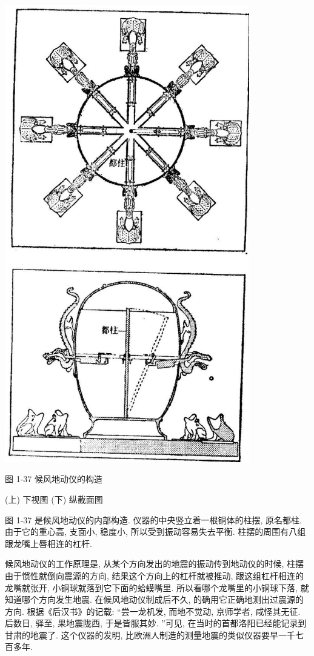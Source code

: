 \documentclass[10pt]{article}
\begin{document}
\begin{center}
\includegraphics[max width=0.8\textwidth]{images/01912d55-147c-70aa-b0e0-1782a122f948_49_654467.jpg}
\end{center}

图 1-37 候风地动仪的构造

(上) 下视图 (下) 纵截面图

图 1-37 是候风地动仪的内部构造. 仪器的中央竖立着一根铜体的柱摆, 原名都柱. 由于它的重心高, 支面小, 稳度小, 所以受到振动容易失去平衡. 柱摆的周围有八组跟龙嘴上唇相连的杠杆.

候风地动仪的工作原理是, 从某个方向发出的地震的振动传到地动仪的时候, 柱摆由于惯性就倒向震源的方向, 结果这个方向上的杠杆就被推动, 跟这组杠杆相连的龙嘴就张开, 小铜球就落到它下面的蛤蟆嘴里. 所以看哪个龙嘴里的小铜球下落, 就知道哪个方向发生地震. 在候风地动仪制成后不久, 的确用它正确地测出过震源的方向. 根据《后汉书》的记载: “尝一龙机发, 而地不觉动, 京师学者, 咸怪其无征. 后数日, 驿至, 果地震陇西, 于是皆服其妙. ”可见, 在当时的首都洛阳已经能记录到甘肃的地震了. 这个仪器的发明, 比欧洲人制造的测量地震的类似仪器要早一千七百多年.
\end{document}
